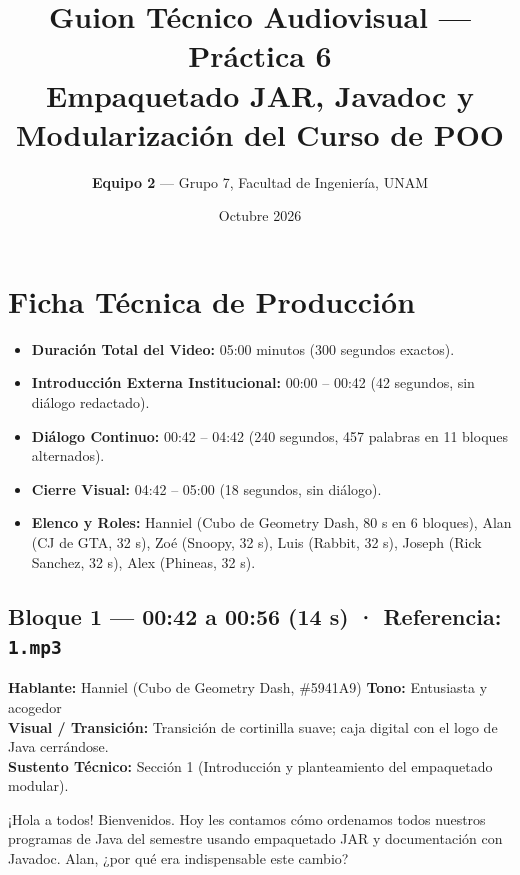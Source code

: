 \documentclass[letterpaper,11pt]{article}
\title{\textbf{Guion Técnico Audiovisual — Práctica 6}\\\large Empaquetado JAR, Javadoc y Modularización del Curso de POO}
\author{\textbf{Equipo 2} — Grupo 7, Facultad de Ingeniería, UNAM}
\date{Octubre 2026}
\begin{document}
\maketitle

\section*{Ficha Técnica de Producción}
\begin{itemize}
    \item \textbf{Duración Total del Video:} 05:00 minutos (300 segundos exactos).
    \item \textbf{Introducción Externa Institucional:} 00:00 -- 00:42 (42 segundos, sin diálogo redactado).
    \item \textbf{Diálogo Continuo:} 00:42 -- 04:42 (240 segundos, 457 palabras en 11 bloques alternados).
    \item \textbf{Cierre Visual:} 04:42 -- 05:00 (18 segundos, sin diálogo).
    \item \textbf{Elenco y Roles:} Hanniel (Cubo de Geometry Dash, 80 s en 6 bloques), Alan (CJ de GTA, 32 s), Zoé (Snoopy, 32 s), Luis (Rabbit, 32 s), Joseph (Rick Sanchez, 32 s), Alex (Phineas, 32 s).
\end{itemize}

\vspace{0.5em}
\noindent\hrulefill
\vspace{0.5em}

\subsection*{Bloque 1 — 00:42 a 00:56 (14 s) · Referencia: \texttt{1.mp3}}
\textbf{Hablante:} Hanniel \textcolor{colorHanniel}{(Cubo de Geometry Dash, \#5941A9)} \hfill \textbf{Tono:} Entusiasta y acogedor\\
\textbf{Visual / Transición:} Transición de cortinilla suave; caja digital con el logo de Java cerrándose.\\
\textbf{Sustento Técnico:} Sección 1 (Introducción y planteamiento del empaquetado modular).
\begin{tcolorbox}[colback=colorHanniel!5,colframe=colorHanniel,title=\textbf{Locución Definitiva — Hanniel}]
¡Hola a todos! Bienvenidos. Hoy les contamos cómo ordenamos todos nuestros programas de Java del semestre usando empaquetado JAR y documentación con Javadoc. Alan, ¿por qué era indispensable este cambio?
\end{tcolorbox}
\end{document}
